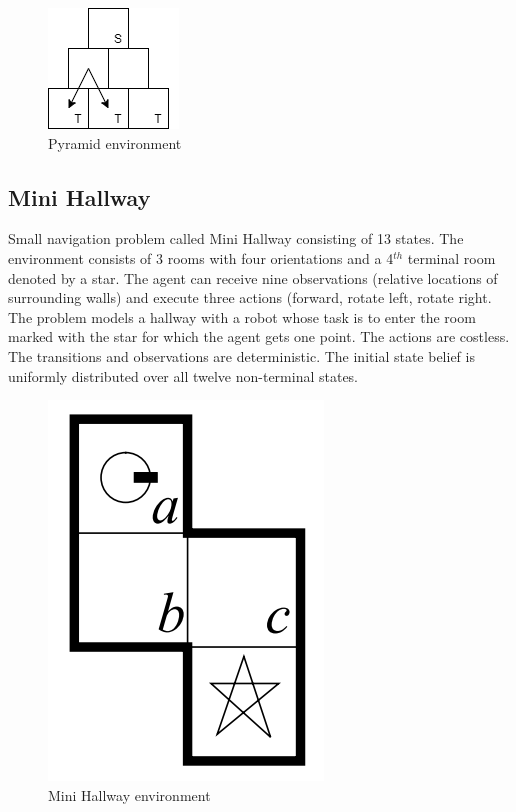 \begin{figure}[ht]
\caption{Pyramid environment}
\centering
\includegraphics[scale=0.5]{pictures/Pyramid.png}
\end{figure}

\subsection{Mini Hallway}

Small navigation problem called Mini Hallway \cite{Littman} consisting of 13 states. The environment consists of 3 rooms with four orientations and a 4$^{th}$ terminal room denoted by a star. The agent can receive nine observations (relative locations of surrounding walls) and execute three actions (forward, rotate left, rotate right.
The problem models a hallway with a robot whose task is to enter the room marked with the star for which the agent gets one point. The actions are costless. The transitions and observations are deterministic. The initial state belief is uniformly distributed over all twelve non-terminal states.
\begin{figure}[ht]
\caption{Mini Hallway environment}
\centering
\includegraphics[scale=0.5]{pictures/MiniHallway.png}
\end{figure}

